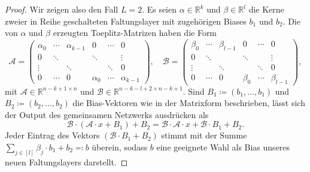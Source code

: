 \documentclass[paper=a4, 	%
		fontsize=11pt,
		abstract=true, 	%
		headsepline, 	%
		notitlepage	%
		]{scrartcl}
\theoremstyle{definition}
\newcommand{\R}{\mathbb{R}}
\newcommand{\fNat}[1]{[ #1 ]}
\begin{document}
\begin{proof}
    Wir zeigen also den Fall $L=2$. Es seien $\alpha\in \R^k$ und $\beta\in\R^l$ die Kerne zweier in Reihe geschalteten Faltungslayer mit zugehörigen Biases $b_1$ und $b_2$.
    Die von $\alpha$ und $\beta$ erzeugten Toeplitz-Matrizen haben die Form
    \setlength\arraycolsep{2pt}
    \def\arraystretch{0.5}
    \[
        \mathcal{A} = \left(
            \begin{matrix}
                \alpha_0 & \cdots & \alpha_{k-1} & 0 & \cdots & 0 \\
                0 & \ddots & & \ddots  & & \vdots \\
                \vdots  & & \ddots & & \ddots & 0 \\[4pt]
                    0 & \cdots & 0 & \alpha_0 & \cdots & \alpha_{k-1}
            \end{matrix}
        \right),\quad
        \mathcal{B} = \left(
            \begin{matrix}
                \beta_0 & \cdots & \beta_{l-1} & 0 & \cdots & 0 \\
                0 & \ddots & & \ddots  & & \vdots \\
                \vdots  & & \ddots & & \ddots & 0 \\[4pt]
                    0 & \cdots & 0 & \beta_0 & \cdots & \beta_{l-1}
            \end{matrix}
        \right),
    \]
    mit $\mathcal{A}\in\R^{n - k + 1\times n}$ und $\mathcal{B}\in \R^{n-k-l+2 \times n-k+1}$.
    Sind $B_1\coloneqq (b_1,\dots,b_1)$ und $B_2\coloneqq (b_2,\dots,b_2)$ die Bias-Vektoren wie in der Matrixform beschrieben, lässt sich der Output des gemeinsamen Netzwerks ausdrücken als
    \[
        \mathcal{B}\cdot \left( \mathcal{A}\cdot x + B_1 \right) + B_2
        = \mathcal{B}\cdot \mathcal{A}\cdot x + \mathcal{B}\cdot B_1 + B_2.
    \]
    Jeder Eintrag des Vektors $(\mathcal{B}\cdot B_1 + B_2)$ stimmt mit der Summe $\sum_{j\in\fNat{l}} \beta_j\cdot b_1 + b_2 \eqqcolon b$ überein, sodass $b$ eine geeignete Wahl als Bias unseres neuen Faltungslayers darstellt.
    

\end{proof}
\end{document}

